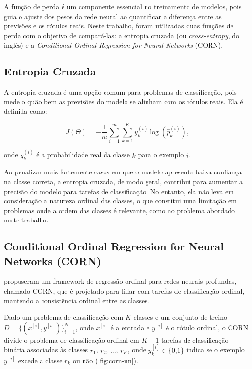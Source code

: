 A função de perda é um componente essencial no treinamento de modelos, pois guia o ajuste dos pesos da rede neural ao quantificar a diferença entre as previsões e os rótulos reais. Neste trabalho, foram utilizadas duas funções de perda com o objetivo de compará-las: a entropia cruzada (ou \textit{cross-entropy}, do inglês) e a \textit{Conditional Ordinal Regression for Neural Networks} (CORN).

\subsection{Entropia Cruzada}

A entropia cruzada é uma opção comum para problemas de classificação, pois mede o quão bem as previsões do modelo se alinham com os rótulos reais. Ela é definida como:

\begin{equation}
    J(\Theta) = -\frac{1}{m} \sum_{i=1}^{m} \sum_{k=1}^{K} y_{k}^{(i)} \log(\hat{p}_k^{(i)}) \text{,}
\end{equation}

onde $y_{k}^{(i)}$ é a probabilidade real da classe $k$ para o exemplo $i$.

Ao penalizar mais fortemente casos em que o modelo apresenta baixa confiança na classe correta, a entropia cruzada, de modo geral, contribui para aumentar a precisão do modelo para tarefas de classificação. No entanto, ela não leva em consideração a natureza ordinal das classes, o que constitui uma limitação em problemas onde a ordem das classes é relevante, como no problema abordado neste trabalho.

\subsection{Conditional Ordinal Regression for Neural Networks (CORN)}

 propuseram um framework de regressão ordinal para redes neurais profundas, chamado CORN, que é projetado para lidar com tarefas de classificação ordinal, mantendo a consistência ordinal entre as classes.

Dado um problema de classificação com $K$ classes e um conjunto de treino $D = \{(x^{[i]}, y^{[i]})\}_{i=1}^{N}$, onde $x^{[i]}$ é a entrada e $y^{[i]}$ é o rótulo ordinal, o CORN divide o problema de classificação ordinal em $K-1$ tarefas de classificação binária associadas às classes $r_1$, $r_2$, $...$, $r_K$, onde $y_{k}^{[i]} \in \lbrace 0 \text{,} 1 \rbrace$ indica se o exemplo $y^{[i]}$ excede a classe $r_k$ ou não (\autoref{fig:corn-nn}).

